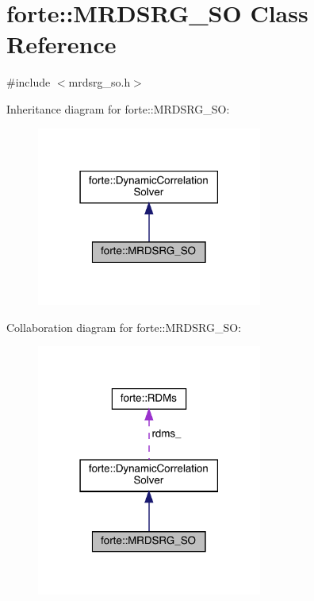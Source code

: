 \hypertarget{classforte_1_1_m_r_d_s_r_g___s_o}{}\section{forte\+:\+:M\+R\+D\+S\+R\+G\+\_\+\+SO Class Reference}
\label{classforte_1_1_m_r_d_s_r_g___s_o}


{\ttfamily \#include $<$mrdsrg\+\_\+so.\+h$>$}



Inheritance diagram for forte\+:\+:M\+R\+D\+S\+R\+G\+\_\+\+SO\+:
\nopagebreak
\begin{figure}[H]
\begin{center}
\leavevmode
\includegraphics[width=210pt]{classforte_1_1_m_r_d_s_r_g___s_o__inherit__graph}
\end{center}
\end{figure}


Collaboration diagram for forte\+:\+:M\+R\+D\+S\+R\+G\+\_\+\+SO\+:
\nopagebreak
\begin{figure}[H]
\begin{center}
\leavevmode
\includegraphics[width=210pt]{classforte_1_1_m_r_d_s_r_g___s_o__coll__graph}
\end{center}
\end{figure}

